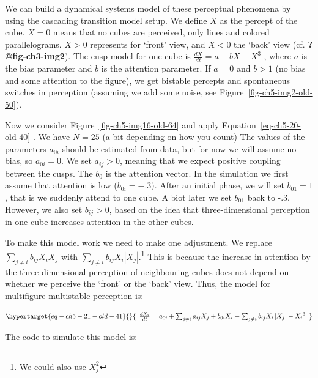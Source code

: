 \documentclass[
  letterpaper,
]{scrbook}
\begin{document}
We can build a dynamical systems model of these perceptual phenomena by
using the cascading transition model setup. We define \(X\) as the
percept of the cube. \(X = 0\) means that no cubes are perceived, only
lines and colored parallelograms. \(X > 0\) represents for `front' view,
and \(X < 0\) the `back' view (cf. \textbf{?@fig-ch3-img2}). The cusp
model for one cube is \(\frac{dX}{dt} = {a + bX - X}^{3}\) , where \(a\)
is the bias parameter and \(b\) is the attention parameter. If \(a = 0\)
and \(b > 1\) (no bias and some attention to the figure), we get
bistable percepts and spontaneous switches in perception (assuming we
add some noise, see Figure~\ref{fig-ch5-img2-old-50}).

Now we consider Figure~\ref{fig-ch5-img16-old-64} and apply
Equation~\ref{eq-ch5-20-old-40} . We have \(N = 25\) (a bit depending on
how you count) The values of the parameters \(a_{0i}\) should be
estimated from data, but for now we will assume no bias, so
\(a_{0i} = 0\). We set \(a_{ij} > 0\), meaning that we expect positive
coupling between the cusps. The \(b_{0}\) is the attention vector. In
the simulation we first assume that attention is low
(\(b_{0i} = - .3)\). After an initial phase, we will set \(b_{01} = 1\),
that is we suddenly attend to one cube. A biot later we set \(b_{01}\)
back to -.3. However, we also set \(b_{ij} > 0\), based on the idea that
three-dimensional perception in one cube increases attention in the
other cubes.

To make this model work we need to make one adjustment. We replace
\(\sum_{j \neq i}^{}{b_{ij}X_{i}X_{j}}\) with
\(\sum_{j \neq i}^{}{b_{ij}X_{i}|X_{j}|}\).\footnote{We could also use
  \(X_j^2\)} This is because the increase in attention by the
three-dimensional perception of neighbouring cubes does not depend on
whether we perceive the `front' or the `back' view. Thus, the model for
multifigure multistable perception is:

\emph{\hfill\break
}\begin{equation}\protect\hypertarget{eq-ch5-21-old-41}{}{\begin{array}{r}
\frac{dX_{i}}{dt} = a_{0i} + \sum_{j \neq i}^{}{a_{ij}X_{j}} + b_{0i}X_{i} + \sum_{j \neq i}^{}{b_{ij}X_{i}\left| X_{j} \right|} - {X_{i}}^{3}
\end{array}}\label{eq-ch5-21-old-41}\end{equation}

The code to simulate this model is:
\end{document}
